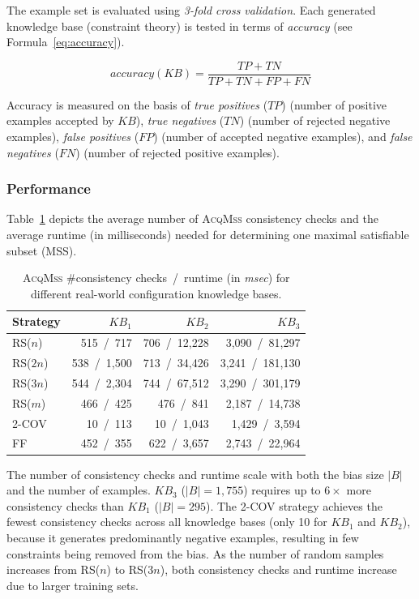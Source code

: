 The example set is evaluated using \textit{3-fold cross validation}. Each generated knowledge base
(constraint theory) is tested in terms of \textit{accuracy} (see Formula~\ref{eq:accuracy}).

\begin{equation}
\label{eq:accuracy}
accuracy(KB) = \frac{TP + TN}{TP + TN + FP + FN}
\end{equation}

Accuracy is measured on the basis of \textit{true positives} ($TP$) (number of positive examples accepted by $KB$), \textit{true negatives} ($TN$) (number of rejected negative examples),
\textit{false positives} ($FP$) (number of accepted negative examples), and \textit{false negatives} ($FN$)
(number of rejected positive examples).


\subsubsection{Performance}

Table~\ref{tab:performance} depicts the average number of \textsc{AcqMss} consistency checks and the average runtime (in milliseconds) needed for determining one maximal satisfiable subset (MSS).

\begin{table}[htbp]
\centering
\caption{\textsc{AcqMss} \#consistency checks~/~runtime (in \textit{msec}) for different real-world configuration knowledge bases.}
\label{tab:performance}
\begin{tabular}{lrrr}
\toprule
Strategy & $KB_1$ & $KB_2$ & $KB_3$ \\
\midrule
RS($n$)  & 515~/~717   & 706~/~12{,}228   & 3{,}090~/~81{,}297 \\
RS($2n$) & 538~/~1{,}500  & 713~/~34{,}426   & 3{,}241~/~181{,}130 \\
RS($3n$) & 544~/~2{,}304  & 744~/~67{,}512   & 3{,}290~/~301{,}179 \\
RS($m$)  & 466~/~425   & 476~/~841     & 2{,}187~/~14{,}738 \\
2-COV    &  10~/~113   &  10~/~1{,}043    & 1{,}429~/~3{,}594 \\
FF       & 452~/~355   & 622~/~3{,}657    & 2{,}743~/~22{,}964 \\
\bottomrule
\end{tabular}
\end{table}

The number of consistency checks and runtime scale with both the bias size $|B|$ and the number of examples. $KB_3$ ($|B|{=}1{,}755$) requires up to $6{\times}$ more consistency checks than $KB_1$ ($|B|{=}295$). The 2-COV strategy achieves the fewest consistency checks across all knowledge bases (only 10 for $KB_1$ and $KB_2$), because it generates predominantly negative examples, resulting in few constraints being removed from the bias. As the number of random samples increases from RS($n$) to RS($3n$), both consistency checks and runtime increase due to larger training sets.

